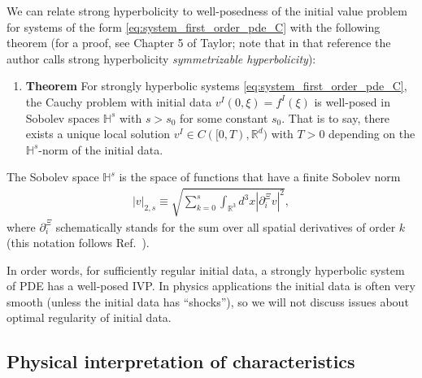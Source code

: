 \documentclass{ws-ijmpd}
\begin{document}
We can relate strong hyperbolicity to
well-posedness of the initial value problem for systems
of the form \eqref{eq:system_first_order_pde_C} with the following theorem
(for a proof, see Chapter 5 of Taylor\cite{Taylor1991}; note
that in that reference the author calls strong hyperbolicity
\emph{symmetrizable hyperbolicity}):
\begin{enumerate}
   \item [] \textbf{Theorem}
   For strongly hyperbolic systems \eqref{eq:system_first_order_pde_C}, 
   the Cauchy problem with initial data 
   $v^I (0, \xi) = f^I (\xi)$ is well-posed in Sobolev
   spaces $\mathbb{H}^s$ with $s > s_0$ for some constant $s_0$. 
   That is to say, there exists a unique local solution
   $v^I \in C([0, T ), \mathbb{R}^d)$ with $T > 0$ 
   depending on the $\mathbb{H}^s$-norm of the initial data.
\end{enumerate}
The Sobolev space $\mathbb{H}^s$ is the space of functions that
have a finite Sobolev norm
\begin{align}
   \left|v\right|_{2,s}
   \equiv
   \sqrt{
      \sum_{k=0}^s
      \int_{\mathbb{R}^3}d^3x 
      \left|\partial_i^{\Xi}v\right|^2
   }
   ,
\end{align}
where $\partial_i^{\Xi}$ schematically stands for the sum over all
spatial derivatives of order $k$ 
(this notation follows Ref.~).

In order words, for sufficiently regular initial data, a strongly hyperbolic
system of PDE has a well-posed IVP.
In physics applications the initial data is often very smooth (unless
the initial data has ``shocks''),
so we will not discuss issues about optimal regularity of initial data.

\subsection{Physical interpretation of characteristics
\label{sec:physical_interpretation_characteristics}
}
\end{document}
